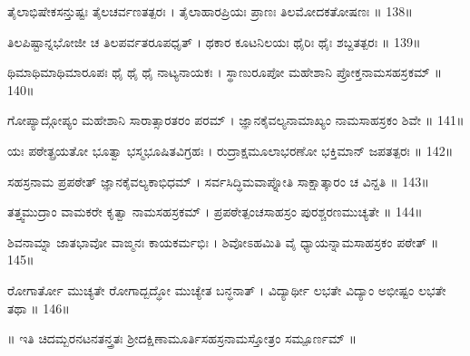 ತೈಲಾಭಿಷೇಕಸನ್ತುಷ್ಟಃ ತೈಲಚರ್ವಣತತ್ಪರಃ ।
ತೈಲಾಹಾರಪ್ರಿಯಃ ಪ್ರಾಣಃ ತಿಲಮೋದಕತೋಷಣಃ ॥ 138॥

ತಿಲಪಿಷ್ಟಾನ್ನಭೋಜೀ ಚ ತಿಲಪರ್ವತರೂಪಧೃತ್ ।
ಥಕಾರ ಕೂಟನಿಲಯಃ ಥೈರಿಃ ಥೈಃ ಶಬ್ದತತ್ಪರಃ ॥ 139॥

ಥಿಮಾಥಿಮಾಥಿಮಾರೂಪಃ ಥೈ ಥೈ ಥೈ ನಾಟ್ಯನಾಯಕಃ ।
ಸ್ಥಾಣುರೂಪೋ ಮಹೇಶಾನಿ ಪ್ರೋಕ್ತನಾಮಸಹಸ್ರಕಮ್ ॥ 140॥

ಗೋಪ್ಯಾದ್ಗೋಪ್ಯಂ ಮಹೇಶಾನಿ ಸಾರಾತ್ಸಾರತರಂ ಪರಮ್ ।
ಜ್ಞಾನಕೈವಲ್ಯನಾಮಾಖ್ಯಂ ನಾಮಸಾಹಸ್ರಕಂ ಶಿವೇ ॥ 141॥

ಯಃ ಪಠೇತ್ಪ್ರಯತೋ ಭೂತ್ವಾ ಭಸ್ಮಭೂಷಿತವಿಗ್ರಹಃ ।
ರುದ್ರಾಕ್ಷಮೂಲಾಭರಣೋ ಭಕ್ತಿಮಾನ್ ಜಪತತ್ಪರಃ ॥ 142॥

ಸಹಸ್ರನಾಮ ಪ್ರಪಠೇತ್ ಜ್ಞಾನಕೈವಲ್ಯಕಾಭಿಧಮ್ ।
ಸರ್ವಸಿದ್ಧಿಮವಾಪ್ನೋತಿ ಸಾಕ್ಷಾತ್ಕಾರಂ ಚ ವಿನ್ದತಿ ॥ 143॥

ತತ್ತ್ವಮುದ್ರಾಂ ವಾಮಕರೇ ಕೃತ್ವಾ ನಾಮಸಹಸ್ರಕಮ್ ।
ಪ್ರಪಠೇತ್ಪಂಚಸಾಹಸ್ರಂ ಪುರಶ್ಚರಣಮುಚ್ಯತೇ ॥ 144॥

ಶಿವನಾಮ್ನಾ ಜಾತಭಾವೋ ವಾಙ್ಮನಃ ಕಾಯಕರ್ಮಭಿಃ ।
ಶಿವೋಽಹಮಿತಿ ವೈ ಧ್ಯಾಯನ್ನಾಮಸಾಹಸ್ರಕಂ ಪಠೇತ್ ॥ 145॥

ರೋಗಾರ್ತೋ ಮುಚ್ಯತೇ ರೋಗಾದ್ಬದ್ಧೋ ಮುಚ್ಯೇತ ಬನ್ಧನಾತ್ ।
ವಿದ್ಯಾರ್ಥೀ ಲಭತೇ ವಿದ್ಯಾಂ ಅಭೀಷ್ಟಂ ಲಭತೇ ತಥಾ ॥ 146॥

॥ ಇತಿ ಚಿದಮ್ಬರನಟನತನ್ತ್ರತಃ ಶ್ರೀದಕ್ಷಿಣಾಮೂರ್ತಿಸಹಸ್ರನಾಮಸ್ತೋತ್ರಂ ಸಮ್ಪೂರ್ಣಮ್ ॥
